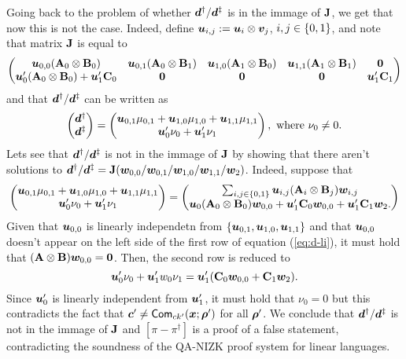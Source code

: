Going back to the problem of whether ${\boldsymbol{d}}^\dag/ {\boldsymbol{d}}^\ddag$ is in the immage of $\mathbf{{J}}$, we get that now this is not the case. Indeed, define ${\boldsymbol{u}}_{i,j}:={\boldsymbol{u}}_i\otimes{\boldsymbol{v}}_j$, $i,j\in\{0,1\}$, and note that matrix $\mathbf{{J}}$ is equal to
$$
\begin{pmatrix}
{\boldsymbol{u}}_{0,0}(\mathbf{{A}}_0\otimes\mathbf{{B}}_0) & {\boldsymbol{u}}_{0,1}(\mathbf{{A}}_0\otimes\mathbf{{B}}_1) & {\boldsymbol{u}}_{1,0}(\mathbf{{A}}_1\otimes\mathbf{{B}}_0) & {\boldsymbol{u}}_{1,1}(\mathbf{{A}}_1\otimes\mathbf{{B}}_1) & {\boldsymbol{0}}\\
{\boldsymbol{u}}'_0(\mathbf{{A}}_0\otimes\mathbf{{B}}_0) +{\boldsymbol{u}}'_1\mathbf{{C}}_0 & {\boldsymbol{0}} & {\boldsymbol{0}} & {\boldsymbol{0}} & {\boldsymbol{u}}'_1\mathbf{{C}}_1
\end{pmatrix}
$$
and that ${\boldsymbol{d}}^\dag/{\boldsymbol{d}}^\ddag$ can be written as
$$
\begin{pmatrix} {\boldsymbol{d}}^\dag\\ {\boldsymbol{d}}^\ddag \end{pmatrix}
=
\begin{pmatrix}
{\boldsymbol{u}}_{0,1}\mu_{0,1} + {\boldsymbol{u}}_{1,0}\mu_{1,0} + {\boldsymbol{u}}_{1,1}\mu_{1,1}\\
{\boldsymbol{u}}'_{0}\nu_{0} + {\boldsymbol{u}}'_1\nu_1
\end{pmatrix},
\text{ where } \nu_0 \neq 0.
$$
Lets see that ${\boldsymbol{d}}^\dag/{\boldsymbol{d}}^\ddag$ is not in the immage of $\mathbf{{J}}$ by showing that there aren't solutions to ${\boldsymbol{d}}^\dag/{\boldsymbol{d}}^\ddag=\mathbf{{J}}({\boldsymbol{w}}_{0,0}/{\boldsymbol{w}}_{0,1}/{\boldsymbol{w}}_{1,0}/{\boldsymbol{w}}_{1,1}/{\boldsymbol{w}}_2)$. Indeed, suppose that
\begin{align}
\begin{pmatrix}
{\boldsymbol{u}}_{0,1}\mu_{0,1} + {\boldsymbol{u}}_{1,0}\mu_{1,0} + {\boldsymbol{u}}_{1,1}\mu_{1,1}\\
{\boldsymbol{u}}'_{0}\nu_{0} + {\boldsymbol{u}}'_1\nu_1
\end{pmatrix}
=
\begin{pmatrix}
\sum_{i,j\in\{0,1\}}{\boldsymbol{u}}_{i,j}(\mathbf{{A}}_i\otimes\mathbf{{B}}_j){\boldsymbol{w}}_{i,j}\\
{\boldsymbol{u}}_0(\mathbf{{A}}_0\otimes\mathbf{{B}}_0){\boldsymbol{w}}_{0,0} + {\boldsymbol{u}}'_1\mathbf{{C}}_0{\boldsymbol{w}}_{0,0}+{\boldsymbol{u}}'_1\mathbf{{C}}_1{\boldsymbol{w}}_2.
\end{pmatrix}
\label{eq:d-li}
\end{align}
Given that ${\boldsymbol{u}}_{0,0}$ is linearly independetn from $\{{\boldsymbol{u}}_{0,1},{\boldsymbol{u}}_{1,0},{\boldsymbol{u}}_{1,1}\}$ and that ${\boldsymbol{u}}_{0,0}$ doesn't appear on the left side of the first row of equation (\ref{eq:d-li}), it must hold that $(\mathbf{{A}}\otimes\mathbf{{B}}){\boldsymbol{w}}_{0,0}={\boldsymbol{0}}$. Then, the second row is reduced to
$$
{\boldsymbol{u}}'_{0}\nu_{0} + {\boldsymbol{u}}'_1w_0\nu_1 = {\boldsymbol{u}}'_1(\mathbf{{C}}_0{\boldsymbol{w}}_{0,0}+\mathbf{{C}}_1{\boldsymbol{w}}_2).
$$
Since ${\boldsymbol{u}}'_0$ is linearly independent from ${\boldsymbol{u}}'_1$, it must hold that $\nu_0=0$ but this contradicts the fact that ${\boldsymbol{c}}'\neq\mathsf{Com}_{ck'}({\boldsymbol{x}};{\boldsymbol{\rho}}')$ for all ${\boldsymbol{\rho}}'$. We conclude that ${\boldsymbol{d}}^\dag/{\boldsymbol{d}}^\ddag$ is not in the immage of $\mathbf{{J}}$ and $[\pi-\pi^\dag]$ is a proof of a false statement, contradicting the soundness of the QA-NIZK proof system for linear languages.

